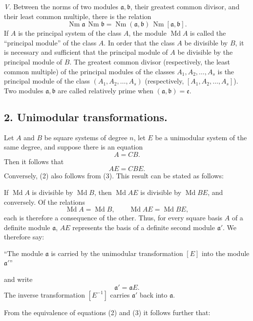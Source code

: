 \documentclass[11pt,a4paper]{article}
\newcommand{\Md}{\operatorname{Md}}
\newcommand{\Nm}{\operatorname{Nm}}
\begin{document}
\emph{V.} Between the norms of two modules $\mathfrak a,\mathfrak b$, their greatest common divisor, and their least common multiple, there is the relation
\[
 \Nm\mathfrak a\,\Nm\mathfrak b
 =\Nm(\mathfrak a,\mathfrak b)\,\Nm[\mathfrak a,\mathfrak b].
\]
If $A$ is the principal system of the class $A$, the module $\Md A$ is called the ``principal module'' of the class $A$. In order that the class $A$ be divisible by $B$, it is necessary and sufficient that the principal module of $A$ be divisible by the principal module of $B$. The greatest common divisor (respectively, the least common multiple) of the principal modules of the classes $A_1,A_2,\ldots,A_s$ is the principal module of the class $(A_1,A_2,\ldots,A_s)$ (respectively, $[A_1,A_2,\ldots,A_s]$). Two modules $\mathfrak a,\mathfrak b$ are called relatively prime when $(\mathfrak a,\mathfrak b)=\mathfrak e$.

\subsection*{2. Unimodular transformations.}

Let $A$ and $B$ be square systems of degree $n$, let $E$ be a unimodular system of the same degree, and suppose there is an equation
\begin{equation}
 A=CB.
\tag{2}
\end{equation}
Then it follows that
\begin{equation}
 AE=CBE.
\tag{3}
\end{equation}
Conversely, (2) also follows from (3). This result can be stated as follows:

If $\Md A$ is divisible by $\Md B$, then $\Md AE$ is divisible by $\Md BE$, and conversely. Of the relations
\begin{equation}
 \Md A=\Md B,
 \qquad
 \Md AE=\Md BE,
\tag{4}
\end{equation}
each is therefore a consequence of the other. Thus, for every square basis $A$ of a definite module $\mathfrak a$, $AE$ represents the basis of a definite second module $\mathfrak a'$. We therefore say:

``The module $\mathfrak a$ is carried by the unimodular transformation $[E]$ into the module $\mathfrak a'$''

and write
\[
 \mathfrak a'=\mathfrak aE.
\]
The inverse transformation $[E^{-1}]$ carries $\mathfrak a'$ back into $\mathfrak a$.

From the equivalence of equations (2) and (3) it follows further that:
\end{document}
